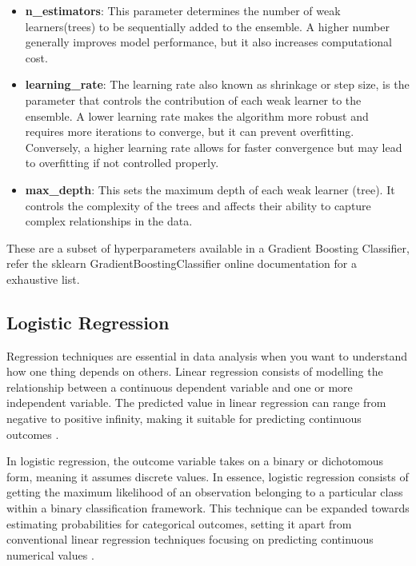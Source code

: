 \begin{itemize}
    \item \textbf{n\_estimators}: This parameter determines the number of weak learners(trees) to be sequentially added to the ensemble. A higher number generally improves model performance, but it also increases computational cost.

    \item \textbf{learning\_rate}: The learning rate also known as shrinkage or step size, is the parameter that controls the contribution of each weak learner to the ensemble. A lower learning rate makes the algorithm more robust and requires more iterations to converge, but it can prevent overfitting. Conversely, a higher learning rate allows for faster convergence but may lead to overfitting if not controlled properly.

    \item \textbf{max\_depth}: This sets the maximum depth of each weak learner (tree). It controls the complexity of the trees and affects their ability to capture complex relationships in the data.


\end{itemize}

These are a subset of hyperparameters available in a Gradient Boosting Classifier, refer the sklearn GradientBoostingClassifier \citep{sklearn_api} online documentation for a exhaustive list. 

\subsection{Logistic Regression}

Regression techniques are essential in data analysis when you want to understand how one thing depends on others. Linear regression consists of modelling the relationship between a continuous dependent variable and one or more independent variable. The predicted value in linear regression can range from negative to positive infinity, making it suitable for predicting continuous outcomes \citep{hosmerlogisticregression}.

In logistic regression, the outcome variable takes on a binary or dichotomous form, meaning it assumes discrete values. In essence, logistic regression consists of getting the maximum likelihood of an observation belonging to a particular class within a binary classification framework. This technique can be expanded towards estimating probabilities for categorical outcomes, setting it apart from conventional linear regression techniques focusing on predicting continuous numerical values \citep{hosmerlogisticregression}.

